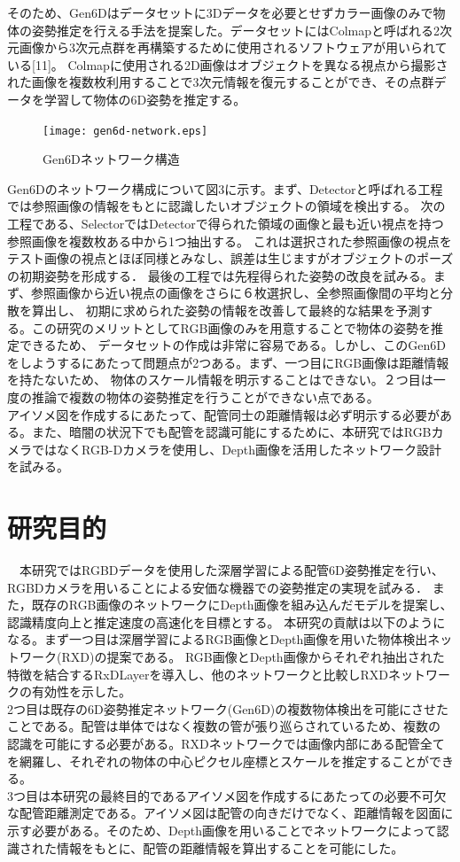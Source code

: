 そのため、Gen6Dはデータセットに3Dデータを必要とせずカラー画像のみで物体の姿勢推定を行える手法を提案した。データセットにはColmapと呼ばれる2次元画像から3次元点群を再構築するために使用されるソフトウェアが用いられている[11]。
Colmapに使用される2D画像はオブジェクトを異なる視点から撮影された画像を複数枚利用することで3次元情報を復元することができ、その点群データを学習して物体の6D姿勢を推定する。\\
\begin{figure}[htbt]
	\centering
	 \texttt{[image: gen6d-network.eps]}
	 \caption{Gen6Dネットワーク構造}
	 \label{fig:f2}
\end{figure}

Gen6Dのネットワーク構成について図3に示す。まず、Detectorと呼ばれる工程では参照画像の情報をもとに認識したいオブジェクトの領域を検出する。
次の工程である、SelectorではDetectorで得られた領域の画像と最も近い視点を持つ参照画像を複数枚ある中から1つ抽出する。
これは選択された参照画像の視点をテスト画像の視点とほぼ同様とみなし、誤差は生じますがオブジェクトのポーズの初期姿勢を形成する．
最後の工程では先程得られた姿勢の改良を試みる。まず、参照画像から近い視点の画像をさらに６枚選択し、全参照画像間の平均と分散を算出し、
初期に求められた姿勢の情報を改善して最終的な結果を予測する。この研究のメリットとしてRGB画像のみを用意することで物体の姿勢を推定できるため、
データセットの作成は非常に容易である。しかし、このGen6Dをしようするにあたって問題点が2つある。まず、一つ目にRGB画像は距離情報を持たないため、
物体のスケール情報を明示することはできない。２つ目は一度の推論で複数の物体の姿勢推定を行うことができない点である。\\
アイソメ図を作成するにあたって、配管同士の距離情報は必ず明示する必要がある。また、暗闇の状況下でも配管を認識可能にするために、本研究ではRGBカメラではなくRGB-Dカメラを使用し、Depth画像を活用したネットワーク設計を試みる。






\section{研究目的}
　本研究ではRGBDデータを使用した深層学習による配管6D姿勢推定を行い、RGBDカメラを用いることによる安価な機器での姿勢推定の実現を試みる．
また，既存のRGB画像のネットワークにDepth画像を組み込んだモデルを提案し、認識精度向上と推定速度の高速化を目標とする。
本研究の貢献は以下のようになる。まず一つ目は深層学習によるRGB画像とDepth画像を用いた物体検出ネットワーク(RXD)の提案である。
RGB画像とDepth画像からそれぞれ抽出された特徴を結合するRxDLayerを導入し、他のネットワークと比較しRXDネットワークの有効性を示した。\\
2つ目は既存の6D姿勢推定ネットワーク(Gen6D)の複数物体検出を可能にさせたことである。配管は単体ではなく複数の管が張り巡らされているため、複数の
認識を可能にする必要がある。RXDネットワークでは画像内部にある配管全てを網羅し、それぞれの物体の中心ピクセル座標とスケールを推定することができる。\\
3つ目は本研究の最終目的であるアイソメ図を作成するにあたっての必要不可欠な配管距離測定である。アイソメ図は配管の向きだけでなく、距離情報を図面に
示す必要がある。そのため、Depth画像を用いることでネットワークによって認識された情報をもとに、配管の距離情報を算出することを可能にした。

